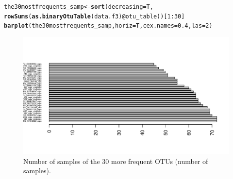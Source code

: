 \documentclass[12pt]{article}\usepackage[]{graphicx}\usepackage[]{color}
\makeatletter
\def\maxwidth{ %
  \ifdim\Gin@nat@width>\linewidth
    \linewidth
  \else
    \Gin@nat@width
  \fi
}
\newcommand{\hlnum}[1]{\textcolor[rgb]{0.686,0.059,0.569}{#1}}%
\newcommand{\hlopt}[1]{\textcolor[rgb]{0,0,0}{#1}}%
\newcommand{\hlstd}[1]{\textcolor[rgb]{0.345,0.345,0.345}{#1}}%
\newcommand{\hlkwb}[1]{\textcolor[rgb]{0.69,0.353,0.396}{#1}}%
\newcommand{\hlkwc}[1]{\textcolor[rgb]{0.333,0.667,0.333}{#1}}%
\newcommand{\hlkwd}[1]{\textcolor[rgb]{0.737,0.353,0.396}{\textbf{#1}}}%
\newenvironment{kframe}{%
 \def\at@end@of@kframe{}%
 \ifinner\ifhmode%
  \def\at@end@of@kframe{\end{minipage}}%
  \begin{minipage}{\columnwidth}%
 \fi\fi%
 \def\FrameCommand##1{\hskip\@totalleftmargin \hskip-\fboxsep
 \colorbox{shadecolor}{##1}\hskip-\fboxsep
     \hskip-\linewidth \hskip-\@totalleftmargin \hskip\columnwidth}%
 \MakeFramed {\advance\hsize-\width
   \@totalleftmargin\z@ \linewidth\hsize
   \@setminipage}}%
 {\par\unskip\endMakeFramed%
 \at@end@of@kframe}
\newenvironment{knitrout}{}{} %
\numberwithin{figure}{section}
\makeatother
\begin{document}
\begin{knitrout}\small
{}\color{fgcolor}\begin{kframe}
\begin{alltt}
\hlstd{the30mostfrequents_samp} \hlkwb{<-} \hlkwd{sort}\hlstd{(}\hlkwc{decreasing} \hlstd{= T,}
                                \hlkwd{rowSums}\hlstd{(}\hlkwd{as.binaryOtuTable}\hlstd{(data.f3)}\hlopt{@}\hlkwc{otu_table}\hlstd{))[}\hlnum{1}\hlopt{:}\hlnum{30}\hlstd{]}
\hlkwd{barplot}\hlstd{(the30mostfrequents_samp,} \hlkwc{horiz} \hlstd{= T,} \hlkwc{cex.names} \hlstd{=} \hlnum{0.4}\hlstd{,} \hlkwc{las} \hlstd{=} \hlnum{2}\hlstd{)}
\end{alltt}
\end{kframe}\begin{figure}

{\centering \includegraphics[width=\maxwidth]{figure/unnamed-chunk-29-1} 

}

\caption[Number of samples of the 30 more frequent OTUs (number of samples)]{Number of samples of the 30 more frequent OTUs (number of samples).}\label{fig:unnamed-chunk-29}
\end{figure}


\end{knitrout}
\end{document}
